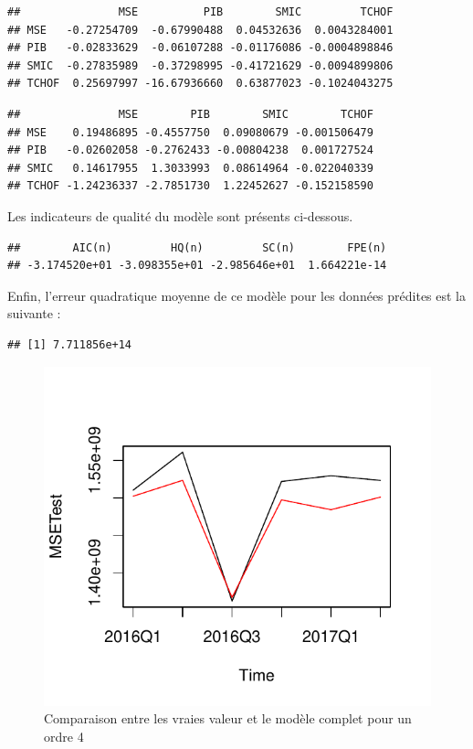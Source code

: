 \documentclass[11pt,]{article}
\begin{document}
\begin{verbatim}
##               MSE          PIB        SMIC         TCHOF
## MSE   -0.27254709  -0.67990488  0.04532636  0.0043284001
## PIB   -0.02833629  -0.06107288 -0.01176086 -0.0004898846
## SMIC  -0.27835989  -0.37298995 -0.41721629 -0.0094899806
## TCHOF  0.25697997 -16.67936660  0.63877023 -0.1024043275
\end{verbatim}

\begin{verbatim}
##               MSE        PIB        SMIC        TCHOF
## MSE    0.19486895 -0.4557750  0.09080679 -0.001506479
## PIB   -0.02602058 -0.2762433 -0.00804238  0.001727524
## SMIC   0.14617955  1.3033993  0.08614964 -0.022040339
## TCHOF -1.24236337 -2.7851730  1.22452627 -0.152158590
\end{verbatim}

Les indicateurs de qualité du modèle sont présents ci-dessous.

\begin{verbatim}
##        AIC(n)         HQ(n)         SC(n)        FPE(n) 
## -3.174520e+01 -3.098355e+01 -2.985646e+01  1.664221e-14
\end{verbatim}

Enfin, l'erreur quadratique moyenne de ce modèle pour les données
prédites est la suivante :

\begin{verbatim}
## [1] 7.711856e+14
\end{verbatim}

\begin{figure}[htbp]
\centering
\includegraphics{doc_files/figure-latex/unnamed-chunk-29-1.pdf}
\caption{\label{fig21} Comparaison entre les vraies valeur et le modèle
complet pour un ordre 4}
\end{figure}
\end{document}

